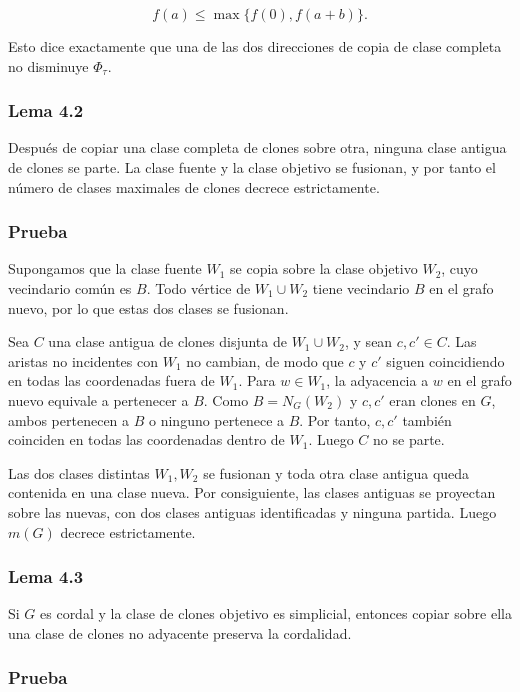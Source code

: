 \documentclass[
  11pt,
]{article}
\begin{document}
\[
f(a)\le\max\{f(0),f(a+b)\}.
\]

Esto dice exactamente que una de las dos direcciones de copia de clase
completa no disminuye \(\Phi_\tau\).

\subsubsection{Lema 4.2}\label{lema-4.2}

Después de copiar una clase completa de clones sobre otra, ninguna clase
antigua de clones se parte. La clase fuente y la clase objetivo se
fusionan, y por tanto el número de clases maximales de clones decrece
estrictamente.

\subsubsection{Prueba}\label{prueba-3}

Supongamos que la clase fuente \(W_1\) se copia sobre la clase objetivo
\(W_2\), cuyo vecindario común es \(B\). Todo vértice de \(W_1\cup W_2\)
tiene vecindario \(B\) en el grafo nuevo, por lo que estas dos clases se
fusionan.

Sea \(C\) una clase antigua de clones disjunta de \(W_1\cup W_2\), y
sean \(c,c'\in C\). Las aristas no incidentes con \(W_1\) no cambian, de
modo que \(c\) y \(c'\) siguen coincidiendo en todas las coordenadas
fuera de \(W_1\). Para \(w\in W_1\), la adyacencia a \(w\) en el grafo
nuevo equivale a pertenecer a \(B\). Como \(B=N_G(W_2)\) y \(c,c'\) eran
clones en \(G\), ambos pertenecen a \(B\) o ninguno pertenece a \(B\).
Por tanto, \(c,c'\) también coinciden en todas las coordenadas dentro de
\(W_1\). Luego \(C\) no se parte.

Las dos clases distintas \(W_1,W_2\) se fusionan y toda otra clase
antigua queda contenida en una clase nueva. Por consiguiente, las clases
antiguas se proyectan sobre las nuevas, con dos clases antiguas
identificadas y ninguna partida. Luego \(m(G)\) decrece estrictamente.

\subsubsection{Lema 4.3}\label{lema-4.3}

Si \(G\) es cordal y la clase de clones objetivo es simplicial, entonces
copiar sobre ella una clase de clones no adyacente preserva la
cordalidad.

\subsubsection{Prueba}\label{prueba-4}
\end{document}
